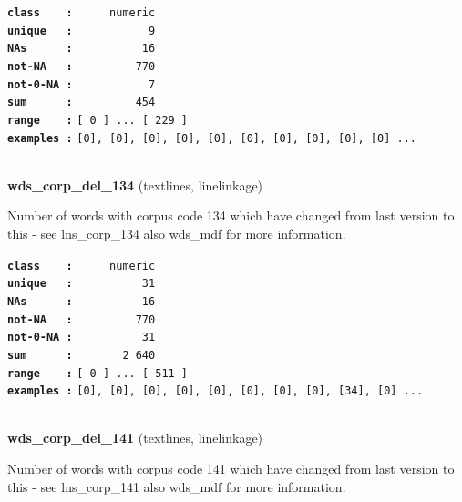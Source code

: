 \documentclass[]{article}
\begin{document}
\textbf{\texttt{class\ \ \ \ :}} \texttt{~~~~~numeric}\\
\textbf{\texttt{unique\ \ \ :}} \texttt{~~~~~~~~~~~9}\\
\textbf{\texttt{NAs\ \ \ \ \ \ :}} \texttt{~~~~~~~~~~16}\\
\textbf{\texttt{not-NA\ \ \ :}} \texttt{~~~~~~~~~770}\\
\textbf{\texttt{not-0-NA\ :}} \texttt{~~~~~~~~~~~7}\\
\textbf{\texttt{sum\ \ \ \ \ \ :}} \texttt{~~~~~~~~~454}\\
\textbf{\texttt{range\ \ \ \ :}}
\texttt{{[}\ 0\ {]}\ ...\ {[}\ 229\ {]}}\\
\textbf{\texttt{examples\ :}}
\texttt{{[}0{]},\ {[}0{]},\ {[}0{]},\ {[}0{]},\ {[}0{]},\ {[}0{]},\ {[}0{]},\ {[}0{]},\ {[}0{]},\ {[}0{]}\ ...}\\

~

\textbf{wds\_corp\_del\_134} (textlines, linelinkage)

Number of words with corpus code 134 which have changed from last
version to this - see lns\_corp\_134 also wds\_mdf for more information.

\textbf{\texttt{class\ \ \ \ :}} \texttt{~~~~~numeric}\\
\textbf{\texttt{unique\ \ \ :}} \texttt{~~~~~~~~~~31}\\
\textbf{\texttt{NAs\ \ \ \ \ \ :}} \texttt{~~~~~~~~~~16}\\
\textbf{\texttt{not-NA\ \ \ :}} \texttt{~~~~~~~~~770}\\
\textbf{\texttt{not-0-NA\ :}} \texttt{~~~~~~~~~~31}\\
\textbf{\texttt{sum\ \ \ \ \ \ :}} \texttt{~~~~~~~2~640}\\
\textbf{\texttt{range\ \ \ \ :}}
\texttt{{[}\ 0\ {]}\ ...\ {[}\ 511\ {]}}\\
\textbf{\texttt{examples\ :}}
\texttt{{[}0{]},\ {[}0{]},\ {[}0{]},\ {[}0{]},\ {[}0{]},\ {[}0{]},\ {[}0{]},\ {[}0{]},\ {[}34{]},\ {[}0{]}\ ...}\\

~

\textbf{wds\_corp\_del\_141} (textlines, linelinkage)

Number of words with corpus code 141 which have changed from last
version to this - see lns\_corp\_141 also wds\_mdf for more information.
\end{document}
